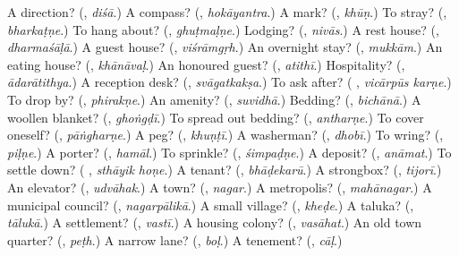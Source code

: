 \begin{tcolorbox}[breakable,colback=teal!4,colframe=teal!35!black,title={Before you move on}]
A direction? (\textbf{}, \emph{diśā}.) A compass? (\textbf{}, \emph{hokāyantra}.) A mark? (\textbf{}, \emph{khūṇ}.) To stray? (\textbf{}, \emph{bharkaṭṇe}.) To hang about? (\textbf{}, \emph{ghuṭmaḷṇe}.) Lodging? (\textbf{}, \emph{nivās}.) A rest house? (\textbf{}, \emph{dharmaśāḷā}.) A guest house? (\textbf{}, \emph{viśrāmgṛh}.) An overnight stay? (\textbf{}, \emph{mukkām}.) An eating house? (\textbf{}, \emph{khānāvaḷ}.) An honoured guest? (\textbf{}, \emph{atithī}.) Hospitality? (\textbf{}, \emph{ādarātithya}.) A reception desk? (\textbf{}, \emph{svāgatkakṣa}.) To ask after? (\textbf{ }, \emph{vicārpūs karṇe}.) To drop by? (\textbf{}, \emph{phirakṇe}.) An amenity? (\textbf{}, \emph{suvidhā}.) Bedding? (\textbf{}, \emph{bichānā}.) A woollen blanket? (\textbf{}, \emph{ghoṅgḍī}.) To spread out bedding? (\textbf{}, \emph{antharṇe}.) To cover oneself? (\textbf{}, \emph{pāṅgharṇe}.) A peg? (\textbf{}, \emph{khuṇṭī}.) A washerman? (\textbf{}, \emph{dhobī}.) To wring? (\textbf{}, \emph{piḷṇe}.) A porter? (\textbf{}, \emph{hamāl}.) To sprinkle? (\textbf{}, \emph{śimpaḍṇe}.) A deposit? (\textbf{}, \emph{anāmat}.) To settle down? (\textbf{ }, \emph{sthāyik hoṇe}.) A tenant? (\textbf{}, \emph{bhāḍekarū}.) A strongbox? (\textbf{}, \emph{tijorī}.) An elevator? (\textbf{}, \emph{udvāhak}.) A town? (\textbf{}, \emph{nagar}.) A metropolis? (\textbf{}, \emph{mahānagar}.) A municipal council? (\textbf{}, \emph{nagarpālikā}.) A small village? (\textbf{}, \emph{kheḍe}.) A taluka? (\textbf{}, \emph{tālukā}.) A settlement? (\textbf{}, \emph{vastī}.) A housing colony? (\textbf{}, \emph{vasāhat}.) An old town quarter? (\textbf{}, \emph{peṭh}.) A narrow lane? (\textbf{}, \emph{boḷ}.) A tenement? (\textbf{}, \emph{cāḷ}.)
\end{tcolorbox}
